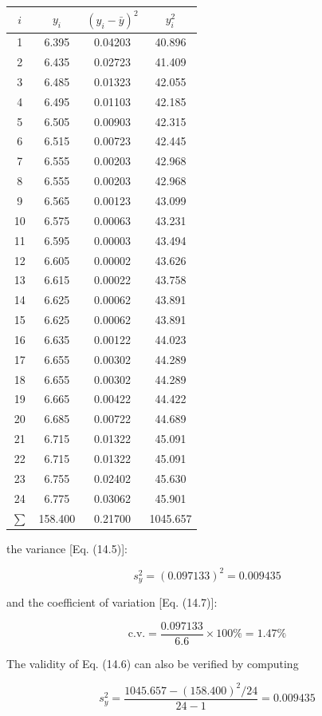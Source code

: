 \documentclass[../main.tex]{subfiles}
\begin{document}
\begin{example}
	\begin{tabular}{cccc}
		$i$ & $y_i$ & $(y_i - \bar{y})^2$ & $y_i^2$\\
		\hline
		1 & 6.395 & 0.04203 & 40.896 \\
		2 & 6.435 & 0.02723 & 41.409 \\
		3 & 6.485 & 0.01323 & 42.055 \\
		4 & 6.495 & 0.01103 & 42.185 \\
		5 & 6.505 & 0.00903 & 42.315 \\
		6 & 6.515 & 0.00723 & 42.445 \\
		7 & 6.555 & 0.00203 & 42.968 \\
		8 & 6.555 & 0.00203 & 42.968 \\
		9 & 6.565 & 0.00123 & 43.099 \\ 
		10 & 6.575 & 0.00063 & 43.231 \\
		11 & 6.595 & 0.00003 & 43.494 \\
		12 & 6.605 & 0.00002 & 43.626 \\ 
		13 & 6.615 & 0.00022 & 43.758 \\
		14 & 6.625 & 0.00062 & 43.891 \\
		15 & 6.625 & 0.00062 & 43.891 \\ 
		16 & 6.635 & 0.00122 & 44.023 \\
		17 & 6.655 & 0.00302 & 44.289 \\
		18 & 6.655 & 0.00302 & 44.289 \\ 
		19 & 6.665 & 0.00422 & 44.422 \\
		20 & 6.685 & 0.00722 & 44.689 \\
		21 & 6.715 & 0.01322 & 45.091 \\ 
		22 & 6.715 & 0.01322 & 45.091 \\
		23 & 6.755 & 0.02402 & 45.630 \\
		24 & 6.775 & 0.03062 & 45.901 \\ 
		$\sum$ &158.400 & 0.21700 & 1045.657
	\end{tabular}

	\noindent the variance [Eq. (14.5)]:

	$$
	s^2_y = (0.097133)^2 = 0.009435
	$$

	\noindent and the coefficient of variation [Eq. (14.7)]:

	$$
		\text{c.v.} = \frac{0.097133}{6.6 } \times 100\% = 1.47\%
	$$

	\noindent The validity of Eq. (14.6) can also be verified by computing

	$$
		s^2_y = \frac{1045.657 - (158.400)^2 /24}{24 - 1} = 0.009435
	$$

\end{example}
\end{document}

